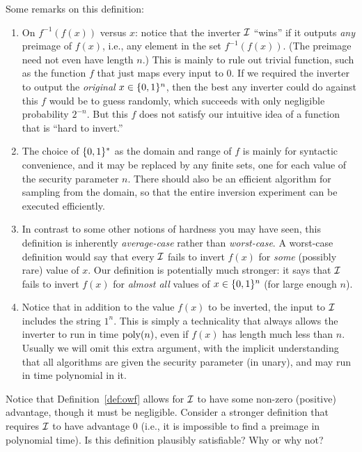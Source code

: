 \documentclass[11pt]{article}
\begin{document}
\noindent Some remarks on this definition:

\begin{enumerate}
\item On $f^{-1}(f(x))$ versus $x$: notice that the inverter $\mathcal{I}$
  ``wins'' if it outputs \emph{any} preimage of $f(x)$, i.e., any
  element in the set $f^{-1}(f(x))$.  (The preimage need not even have
  length $n$.)  This is mainly to rule out trivial function, such as
  the function $f$ that just maps every input to $0$.  If we required
  the inverter to output the \emph{original} $x \in \{0,1\}^{n}$, then
  the best any inverter could do against this $f$ would be to guess
  randomly, which succeeds with only negligible probability $2^{-n}$.
  But this $f$ does not satisfy our intuitive idea of a function that
  is ``hard to invert.''
  
\item The choice of $\{0,1\}^{*}$ as the domain and range of $f$ is
  mainly for syntactic convenience, and it may be replaced by any
  finite sets, one for each value of the security parameter $n$.
  There should also be an efficient algorithm for sampling from the
  domain, so that the entire inversion experiment can be executed
  efficiently.

\item In contrast to some other notions of hardness you may have seen,
  this definition is inherently \emph{average-case} rather than
  \emph{worst-case}.  A worst-case definition would say that every
  $\mathcal{I}$ fails to invert $f(x)$ for \emph{some} (possibly rare) value
  of $x$.  Our definition is potentially much stronger: it says that
  $\mathcal{I}$ fails to invert $f(x)$ for \emph{almost all} values of $x \in
  \{0,1\}^{n}$ (for large enough $n$).\label{item:worst-average}
  
\item Notice that in addition to the value $f(x)$ to be inverted, the
  input to $\mathcal{I}$ includes the string $1^{n}$.  This is simply a
  technicality that always allows the inverter to run in time
  $\operatorname{poly}(n)$, even if $f(x)$ has length much less than $n$.  Usually
  we will omit this extra argument, with the implicit understanding
  that all algorithms are given the security parameter (in unary), and
  may run in time polynomial in it.
\end{enumerate}

\begin{question}
  Notice that Definition~\ref{def:owf} allows for \(\mathcal{I}\) to have
  some non-zero (positive) advantage, though it must be
  negligible. Consider a stronger definition that requires \(\mathcal{I}\) to
  have advantage 0 (i.e., it is impossible to find a preimage in
  polynomial time). Is this definition plausibly satisfiable?  Why or
  why not?
\end{question}
  
\end{document}
